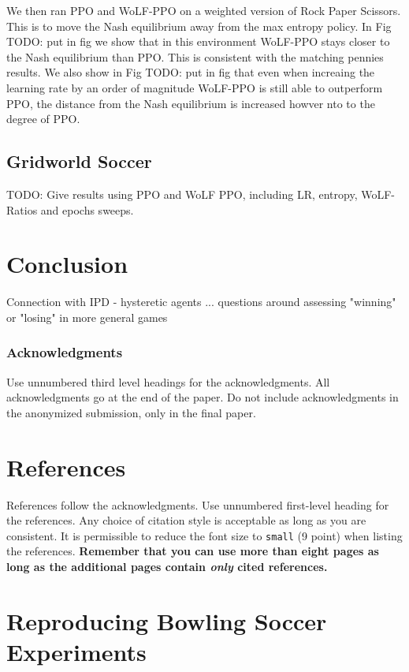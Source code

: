 \documentclass{article}
\newcommand\TODO[1]{{\color{red}TODO: #1}}
\begin{document}
We then ran PPO and WoLF-PPO on a weighted version of Rock Paper Scissors. This is to move the Nash equilibrium away from the max entropy policy. In Fig \TODO{put in fig} we show that in this environment WoLF-PPO stays closer to the Nash equilibrium than PPO. This is consistent with the matching pennies results. We also show in Fig \TODO{put in fig} that even when increaing the learning rate by an order of magnitude WoLF-PPO is still able to outperform PPO, the distance from the Nash equilibrium is increased howver nto to the degree of PPO.

\subsection{Gridworld Soccer}

\TODO{Give results using PPO and WoLF PPO, including LR, entropy, WoLF-Ratios and epochs sweeps.}

\section{Conclusion}

Connection with IPD - hysteretic agents ... questions around assessing "winning" or "losing" in more general games

\subsubsection*{Acknowledgments}

Use unnumbered third level headings for the acknowledgments. All acknowledgments
go at the end of the paper. Do not include acknowledgments in the anonymized
submission, only in the final paper.

\section*{References}

References follow the acknowledgments. Use unnumbered first-level heading for
the references. Any choice of citation style is acceptable as long as you are
consistent. It is permissible to reduce the font size to \verb+small+ (9 point)
when listing the references. {\bf Remember that you can use more than eight
  pages as long as the additional pages contain \emph{only} cited references.}
  
\section*{Reproducing Bowling Soccer Experiments}
\end{document}
